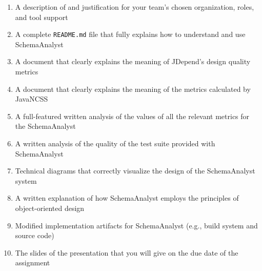 \vspace*{-.1in}
\begin{enumerate}
    \itemsep0em
    \item A description of and justification for your team's chosen organization, roles, and tool support
    \item A complete {\tt README.md} file that fully explains how to understand and use SchemaAnalyst
    \item A document that clearly explains the meaning of JDepend's design quality metrics
    \item A document that clearly explains the meaning of the metrics calculated by JavaNCSS
    \item A full-featured written analysis of the values of all the relevant metrics for the SchemaAnalyst
    \item A written analysis of the quality of the test suite provided with SchemaAnalyst
    \item Technical diagrams that correctly visualize the design of the SchemaAnalyst system
    \item A written explanation of how SchemaAnalyst employs the principles of object-oriented design
    \item Modified implementation artifacts for SchemaAnalyst (e.g., build system and source code)
    \item The slides of the presentation that you will give on the due date of the assignment
\end{enumerate}
\vspace*{-.1in}


\printbibliography[filter=papers,title={References}]



